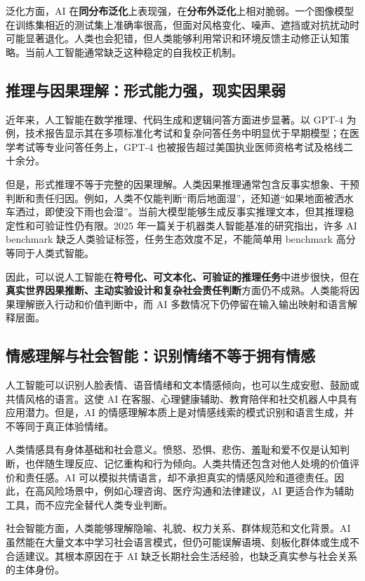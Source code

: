 \documentclass[UTF8,zihao=5,a4paper]{ctexart}
\begin{document}
泛化方面，AI 在\textbf{同分布泛化}上表现强，在\textbf{分布外泛化}上相对脆弱。一个图像模型在训练集相近的测试集上准确率很高，但面对风格变化、噪声、遮挡或对抗扰动时可能显著退化。人类也会犯错，但人类能够利用常识和环境反馈主动修正认知策略。当前人工智能通常缺乏这种稳定的自我校正机制。

\subsection{推理与因果理解：形式能力强，现实因果弱}

近年来，人工智能在数学推理、代码生成和逻辑问答方面进步显著。以 GPT-4 为例，技术报告显示其在多项标准化考试和复杂问答任务中明显优于早期模型；在医学考试等专业问答任务上，GPT-4 也被报告超过美国执业医师资格考试及格线二十余分\cite{openai2023gpt4,nori2023gpt4medical}。

但是，形式推理不等于完整的因果理解。人类因果推理通常包含反事实想象、干预判断和责任归因。例如，人类不仅能判断“雨后地面湿”，还知道“如果地面被洒水车洒过，即使没下雨也会湿”。当前大模型能够生成反事实推理文本，但其推理稳定性和可验证性仍有限。2025 年一篇关于机器类人智能基准的研究指出，许多 AI benchmark 缺乏人类验证标签，任务生态效度不足，不能简单用 benchmark 高分等同于人类式智能\cite{ying2025benchmarking}。

因此，可以说人工智能在\textbf{符号化、可文本化、可验证的推理任务}中进步很快，但在\textbf{真实世界因果推断、主动实验设计和复杂社会责任判断}方面仍不成熟。人类能将因果理解嵌入行动和价值判断中，而 AI 多数情况下仍停留在输入输出映射和语言解释层面。

\subsection{情感理解与社会智能：识别情绪不等于拥有情感}

人工智能可以识别人脸表情、语音情绪和文本情感倾向，也可以生成安慰、鼓励或共情风格的语言。这使 AI 在客服、心理健康辅助、教育陪伴和社交机器人中具有应用潜力。但是，AI 的情感理解本质上是对情感线索的模式识别和语言生成，并不等同于真正体验情绪。

人类情感具有身体基础和社会意义。愤怒、恐惧、悲伤、羞耻和爱不仅是认知判断，也伴随生理反应、记忆重构和行为倾向。人类共情还包含对他人处境的价值评价和责任感。AI 可以模拟共情语言，却不承担真实的情感风险和道德责任。因此，在高风险场景中，例如心理咨询、医疗沟通和法律建议，AI 更适合作为辅助工具，而不应完全替代人类专业判断。

社会智能方面，人类能够理解隐喻、礼貌、权力关系、群体规范和文化背景。AI 虽然能在大量文本中学习社会语言模式，但仍可能误解语境、刻板化群体或生成不合适建议。其根本原因在于 AI 缺乏长期社会生活经验，也缺乏真实参与社会关系的主体身份。
\end{document}
